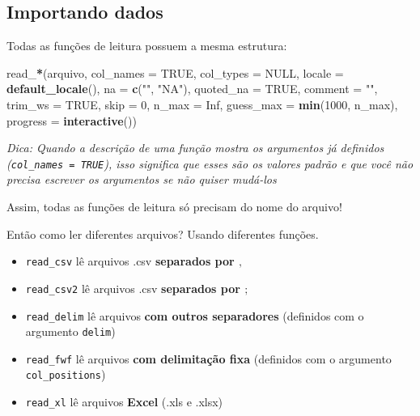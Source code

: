 \documentclass[]{book}
\newenvironment{Shaded}{\begin{snugshade}}{\end{snugshade}}
\newcommand{\KeywordTok}[1]{\textcolor[rgb]{0.13,0.29,0.53}{\textbf{#1}}}
\newcommand{\DataTypeTok}[1]{\textcolor[rgb]{0.13,0.29,0.53}{#1}}
\newcommand{\DecValTok}[1]{\textcolor[rgb]{0.00,0.00,0.81}{#1}}
\newcommand{\StringTok}[1]{\textcolor[rgb]{0.31,0.60,0.02}{#1}}
\newcommand{\OtherTok}[1]{\textcolor[rgb]{0.56,0.35,0.01}{#1}}
\newcommand{\OperatorTok}[1]{\textcolor[rgb]{0.81,0.36,0.00}{\textbf{#1}}}
\newcommand{\NormalTok}[1]{#1}
\providecommand{\tightlist}{%
  \setlength{\itemsep}{0pt}\setlength{\parskip}{0pt}}
\theoremstyle{definition}
\theoremstyle{definition}
\theoremstyle{definition}
\theoremstyle{remark}
\begin{document}
\subsection{Importando dados}\label{importando-dados}

Todas as funções de leitura possuem a mesma estrutura:

\begin{Shaded}
\begin{Highlighting}[]
\NormalTok{read_}\OperatorTok{*}\NormalTok{(arquivo, }\DataTypeTok{col_names =} \OtherTok{TRUE}\NormalTok{, }\DataTypeTok{col_types =} \OtherTok{NULL}\NormalTok{, }\DataTypeTok{locale =} \KeywordTok{default_locale}\NormalTok{(), }\DataTypeTok{na =} \KeywordTok{c}\NormalTok{(}\StringTok{""}\NormalTok{, }\StringTok{"NA"}\NormalTok{),}
\DataTypeTok{quoted_na =} \OtherTok{TRUE}\NormalTok{, }\DataTypeTok{comment =} \StringTok{""}\NormalTok{, }\DataTypeTok{trim_ws =} \OtherTok{TRUE}\NormalTok{, }\DataTypeTok{skip =} \DecValTok{0}\NormalTok{, }\DataTypeTok{n_max =} \OtherTok{Inf}\NormalTok{, }\DataTypeTok{guess_max =} \KeywordTok{min}\NormalTok{(}\DecValTok{1000}\NormalTok{,}
\NormalTok{n_max), }\DataTypeTok{progress =} \KeywordTok{interactive}\NormalTok{())}
\end{Highlighting}
\end{Shaded}

\emph{Dica: Quando a descrição de uma função mostra os argumentos já
definidos (\texttt{col\_names\ =\ TRUE}), isso significa que esses são
os valores padrão e que você não precisa escrever os argumentos se não
quiser mudá-los}

Assim, todas as funções de leitura só precisam do nome do arquivo!

Então como ler diferentes arquivos? Usando diferentes funções.

\begin{itemize}
\tightlist
\item
  \texttt{read\_csv} lê arquivos .csv \textbf{separados por \(,\)}\\
\item
  \texttt{read\_csv2} lê arquivos .csv \textbf{separados por \(;\)}\\
\item
  \texttt{read\_delim} lê arquivos \textbf{com outros separadores}
  (definidos com o argumento \texttt{delim})\\
\item
  \texttt{read\_fwf} lê arquivos \textbf{com delimitação fixa}
  (definidos com o argumento \texttt{col\_positions})\\
\item
  \texttt{read\_xl} lê arquivos \textbf{Excel} (.xls e .xlsx)
\end{itemize}
\end{document}
